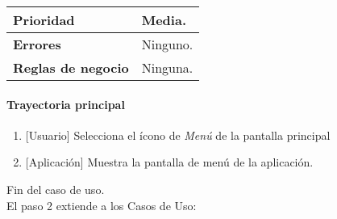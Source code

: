 \begin{longtable}{|J{5cm}|J{10.3cm}|}
		\\ \hline 
	\textbf{Prioridad} & 
		Media. \\ \hline
	\textbf{Errores} & Ninguno.
		\\ \hline
	\textbf{Reglas de negocio} & Ninguna.
		 \\ \hline
\end{longtable}

\paragraph{Trayectoria principal}
	\begin{enumerate}
		\item {[Usuario]} Selecciona el ícono de \textit{Menú} de la pantalla principal %
		\item {[Aplicación]} Muestra la pantalla de menú de la aplicación. %
	\end{enumerate}
	Fin del caso de uso.\\
	El paso 2 extiende a los Casos de Uso: 
	
	

